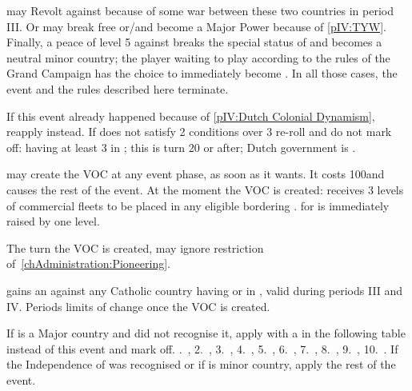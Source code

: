 \effetlong
\aparag \paysHollande may Revolt against \SPA because of some war between
these two countries in period III.
\aparag Or \paysHollande may break free or/and become a Major Power because of
\ref{pIV:TYW}.
\aparag Finally, a peace of level 5 against \SPA breaks the special status of
\VASSAL and \paysHollande becomes a neutral minor country; the player waiting
to play \HOL according to the rules of the Grand Campaign has the choice to
immediately become \HOL.
\aparag In all those cases, the event and the rules described here terminate.





\condition{}
\aparag If this event already happened because of \ref{pIV:Dutch Colonial
  Dynamism}, reapply  instead.
\aparag If \HOL does not satisfy 2 conditions over 3 re-roll and do not mark
off: having at least 3 \TP in ; this is turn 20 or after;
Dutch government is .

\phevnt
\aparag \HOL may create the VOC at any event phase, as soon as it wants. It
costs 100\ducats and causes the rest of the event.
\aparag At the moment the VOC is created:
\bparag \HOL receives 3 levels of commercial fleets to be placed in any
eligible \STZ bordering .
\bparag \FTI for \HOL is immediately raised by one level.


\phadm
\aparag The turn the VOC is created, \HOL may ignore restriction
of~\ref{chAdministration:Pioneering}.

\effetlong
\aparag \HOL gains an \OCB against any Catholic country having \TP or \COL in
, valid during periods III and IV.
\aparag Periods limits of \HOL change once the VOC is created.




\condition{}
\aparag If \HOL is a Major country and \SPA did not recognise it, apply \RD
with a \REVOLT in the following table instead of this event and mark off.
.~\provinceZeeland, 2.~\provinceHolland, 3.~\provinceUtrecht,
4.~\provinceLimburg, 5.~\provinceLiege, 6.~\provinceLuxemburg,
7.~\provinceHainaut, 8.~\provinceFlandre, 9.~\provinceVlaanderen,
10.~\provinceBrabant.
\aparag If the Independence of \HOL was recognised or if \paysHollande is
minor country, apply the rest of the event.

